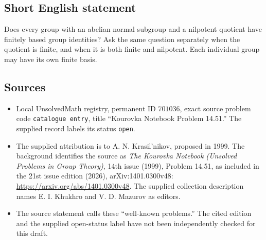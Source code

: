 \documentclass[11pt]{article}
\begin{document}
\subsection{Short English statement}
Does every group with an abelian normal subgroup and a nilpotent quotient have finitely based group identities? Ask the same question separately when the quotient is finite, and when it is both finite and nilpotent. Each individual group may have its own finite basis.
\subsection{Sources}
\begin{itemize}
\item Local UnsolvedMath registry, permanent ID \(701036\), exact source problem code \texttt{catalogue entry}, title ``Kourovka Notebook Problem 14.51.'' The supplied record labels its status \texttt{open}.
\item The supplied attribution is to A. N. Krasil'nikov, proposed in 1999. The background identifies the source as \emph{The Kourovka Notebook (Unsolved Problems in Group Theory)}, 14th issue (1999), Problem 14.51, as included in the 21st issue edition (2026), arXiv:1401.0300v48: \url{https://arxiv.org/abs/1401.0300v48}. The supplied collection description names E. I. Khukhro and V. D. Mazurov as editors.
\item The source statement calls these ``well-known problems.'' The cited edition and the supplied open-status label have not been independently checked for this draft.
\end{itemize}
\end{document}
